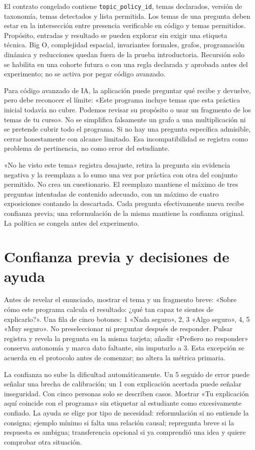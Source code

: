 \documentclass[11pt,a4paper]{report}
\begin{document}
El contrato congelado contiene \texttt{topic\_policy\_id}, temas declarados, versión de taxonomía, temas detectados y lista permitida. Los temas de una pregunta deben estar en la intersección entre presencia verificable en código y temas permitidos. Propósito, entradas y resultado se pueden explorar sin exigir una etiqueta técnica. Big O, complejidad espacial, invariantes formales, grafos, programación dinámica y reducciones quedan fuera de la prueba introductoria. Recursión solo se habilita en una cohorte futura o con una regla declarada y aprobada antes del experimento; no se activa por pegar código avanzado.

Para código avanzado de IA, la aplicación puede preguntar qué recibe y devuelve, pero debe reconocer el límite: «Este programa incluye temas que esta práctica inicial todavía no cubre. Podemos revisar su propósito o usar un fragmento de los temas de tu curso». No se simplifica falsamente un grafo a una multiplicación ni se pretende cubrir todo el programa. Si no hay una pregunta específica admisible, cerrar honestamente con alcance limitado. Esa incompatibilidad se registra como problema de pertinencia, no como error del estudiante.

«No he visto este tema» registra desajuste, retira la pregunta sin evidencia negativa y la reemplaza a lo sumo una vez por práctica con otra del conjunto permitido. No crea un cuestionario. El reemplazo mantiene el máximo de tres preguntas intentadas de contenido adecuado, con un máximo de cuatro exposiciones contando la descartada. Cada pregunta efectivamente nueva recibe confianza previa; una reformulación de la misma mantiene la confianza original. La política se congela antes del experimento.

\section{Confianza previa y decisiones de ayuda}
Antes de revelar el enunciado, mostrar el tema y un fragmento breve: «Sobre cómo este programa calcula el resultado: ¿qué tan capaz te sientes de explicarlo?». Una fila de cinco botones: 1 «Nada seguro», 2, 3 «Algo seguro», 4, 5 «Muy seguro». No preseleccionar ni preguntar después de responder. Pulsar registra y revela la pregunta en la misma tarjeta; añadir «Prefiero no responder» conserva autonomía y marca dato faltante, sin imputarlo a 3. Esta excepción se acuerda en el protocolo antes de comenzar; no altera la métrica primaria.

La confianza no sube la dificultad automáticamente. Un 5 seguido de error puede señalar una brecha de calibración; un 1 con explicación acertada puede señalar inseguridad. Con cinco personas solo se describen casos. Mostrar «Tu explicación aquí coincide con el programa» sin etiquetar al estudiante como excesivamente confiado. La ayuda se elige por tipo de necesidad: reformulación si no entiende la consigna; ejemplo mínimo si falta una relación causal; repregunta breve si la respuesta es ambigua; transferencia opcional si ya comprendió una idea y quiere comprobar otra situación.
\end{document}
